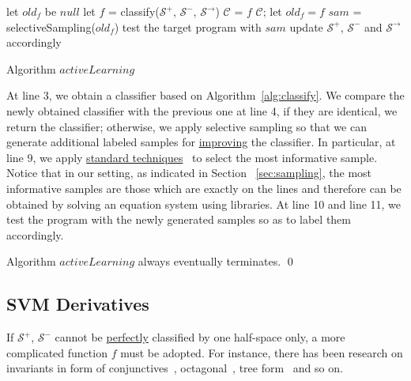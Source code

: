\begin{algorithm}[!h]
\SetAlgoVlined
\Indm
{}
\Indp
let $old_f$ be $null$\;
 {
    let $f$ = classify($\mathcal{S}^+$, $\mathcal{S}^-$, $\mathcal{S}^\rightarrow$)\;
     {
         {
            $\mathcal{C}$ = $f$\;
            \Return $\mathcal{C}$;
        }
        let $old_f = f$\;
    }
    $sam$ = selectiveSampling($old_f$)\;
    test the target program with $sam$\;
    update $\mathcal{S}^+$, $\mathcal{S}^-$ and $\mathcal{S}^\rightarrow$ accordingly\;
}
\caption{Algorithm $activeLearning$}
\label{alg:active}
\end{algorithm}

At line 3, we obtain a classifier based on Algorithm~\ref{alg:classify}. 
We compare the newly obtained classifier with the previous one at line 4, if they are identical, we return the classifier; 
otherwise, we apply selective sampling so that we can generate additional labeled samples for \underline{improving} the classifier. 
In particular, at line 9, we apply \underline{standard techniques}~\cite{DBLP:conf/icml/SchohnC00} to select the most informative sample. 
Notice that in our setting, as indicated in Section ~\ref{sec:sampling}, the most informative samples are those which are exactly on the lines 
and therefore can be obtained by solving an equation system using libraries. 
At line 10 and line 11, we test the program with the newly generated samples so as to label them accordingly.


\begin{proposition}
Algorithm $activeLearning$ always eventually terminates. \hfill \qed
\end{proposition}


\subsection{SVM Derivatives}
\label{subsec:svm:derivatives}
If $\mathcal{S}^+$, $\mathcal{S}^-$ cannot be \underline{perfectly} classified by one half-space only, 
a more complicated function $f$ must be adopted. 
For instance, there has been research on invariants in form of conjunctives~\cite{sharma2012interpolants}, 
octagonal~\cite{mine2006octagon}, tree form~\cite{krishna2015learning}\cite{garg2015learning} and so on.

